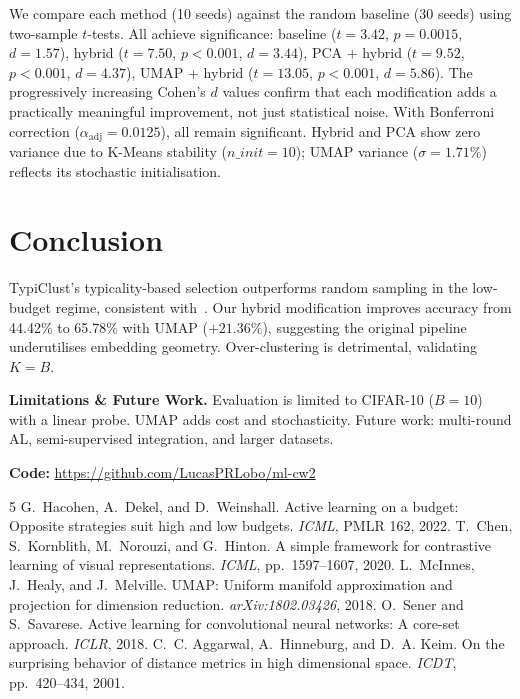 \documentclass[10pt, twocolumn]{article}
\begin{document}
We compare each method (10 seeds) against the random baseline (30 seeds) using two-sample $t$-tests. All achieve significance: baseline ($t = 3.42$, $p = 0.0015$, $d = 1.57$), hybrid ($t = 7.50$, $p < 0.001$, $d = 3.44$), PCA + hybrid ($t = 9.52$, $p < 0.001$, $d = 4.37$), UMAP + hybrid ($t = 13.05$, $p < 0.001$, $d = 5.86$). The progressively increasing Cohen's $d$ values confirm that each modification adds a practically meaningful improvement, not just statistical noise. With Bonferroni correction ($\alpha_{\text{adj}} = 0.0125$), all remain significant. Hybrid and PCA show zero variance due to K-Means stability ($n\_init = 10$); UMAP variance ($\sigma = 1.71\%$) reflects its stochastic initialisation.

\section{Conclusion}

TypiClust's typicality-based selection outperforms random sampling in the low-budget regime, consistent with~\cite{hacohen2022active}. Our hybrid modification improves accuracy from 44.42\% to 65.78\% with UMAP ($+21.36\%$), suggesting the original pipeline underutilises embedding geometry. Over-clustering is detrimental, validating $K = B$.

\textbf{Limitations \& Future Work.} Evaluation is limited to CIFAR-10 ($B=10$) with a linear probe. UMAP adds cost and stochasticity. Future work: multi-round AL, semi-supervised integration, and larger datasets.

\noindent\textbf{Code:} \url{https://github.com/LucasPRLobo/ml-cw2}



{\footnotesize
\begin{thebibliography}{5}
G.~Hacohen, A.~Dekel, and D.~Weinshall.
Active learning on a budget: Opposite strategies suit high and low budgets.
\emph{ICML}, PMLR 162, 2022.
T.~Chen, S.~Kornblith, M.~Norouzi, and G.~Hinton.
A simple framework for contrastive learning of visual representations.
\emph{ICML}, pp.\ 1597--1607, 2020.
L.~McInnes, J.~Healy, and J.~Melville.
UMAP: Uniform manifold approximation and projection for dimension reduction.
\emph{arXiv:1802.03426}, 2018.
O.~Sener and S.~Savarese.
Active learning for convolutional neural networks: A core-set approach.
\emph{ICLR}, 2018.
C.~C. Aggarwal, A.~Hinneburg, and D.~A. Keim.
On the surprising behavior of distance metrics in high dimensional space.
\emph{ICDT}, pp.\ 420--434, 2001.
\end{thebibliography}
}
\end{document}
